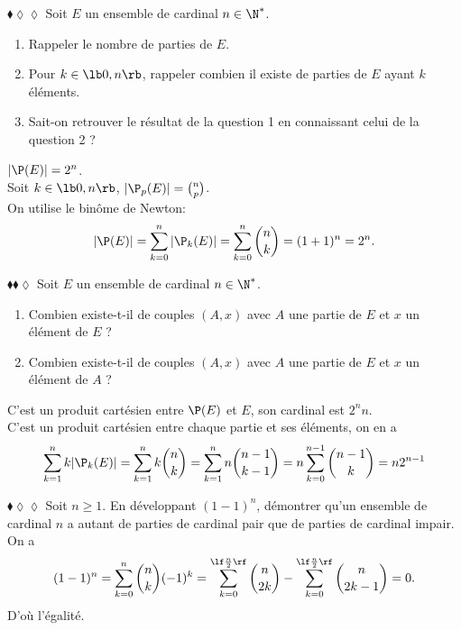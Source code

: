 \documentclass[11pt]{article}
\begin{document}
\begin{exercice}{$\blacklozenge\lozenge\lozenge$}{}
    Soit $E$ un ensemble de cardinal $n\in\N^*$.
    \begin{enumerate}
        \item Rappeler le nombre de parties de $E$.
        \item Pour $k\in\lb0,n\rb$, rappeler combien il existe de parties de $E$ ayant $k$ éléments.
        \item Sait-on retrouver le résultat de la question 1 en connaissant celui de la question 2 ?
    \end{enumerate}
    \tcblower
     $|\P(E)|=2^n$.\\
     Soit $k\in\lb0,n\rb$, $|\P_p(E)|=\binom{n}{p}$.\\
     On utilise le binôme de Newton:
    \begin{equation*}
        |\P(E)|=\sum_{k=0}^n|\P_k(E)|=\sum_{k=0}^n\binom{n}{k}=(1+1)^n=2^n.
    \end{equation*}
\end{exercice}

\begin{exercice}{$\blacklozenge\blacklozenge\lozenge$}{}
    Soit $E$ un ensemble de cardinal $n\in\N^*$.
    \begin{enumerate}
        \item Combien existe-t-il de couples $(A,x)$ avec $A$ une partie de $E$ et $x$ un élément de $E$ ?
        \item Combien existe-t-il de couples $(A,x)$ avec $A$ une partie de $E$ et $x$ un élément de $A$ ?
    \end{enumerate}
    \tcblower
     C'est un produit cartésien entre $\P(E)$ et $E$, son cardinal est $2^nn$.\\
     C'est un produit cartésien entre chaque partie et ses éléments, on en a
    \begin{equation*}
        \sum_{k=1}^nk|\P_k(E)|=\sum_{k=1}^nk\binom{n}{k}=\sum_{k=1}^nn\binom{n-1}{k-1}=n\sum_{k=0}^{n-1}\binom{n-1}{k}=n2^{n-1}
    \end{equation*}
\end{exercice}

\begin{exercice}{$\blacklozenge\lozenge\lozenge$}{}
    Soit $n\geq1$. En développant $(1-1)^n$, démontrer qu'un ensemble de cardinal $n$ a autant de parties de cardinal pair que de parties de cardinal impair.
    \tcblower
    On a
    \begin{equation*}
        (1-1)^n=\sum_{k=0}^n\binom{n}{k}(-1)^k=\sum_{k=0}^{\lf\frac{n}{2}\rf}\binom{n}{2k}-\sum_{k=0}^{\lf\frac{n}{2}\rf}\binom{n}{2k-1}=0.
    \end{equation*}
    D'où l'égalité.
\end{exercice}
\end{document}
